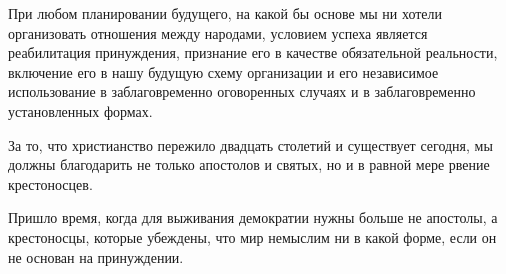 При любом планировании будущего, на какой бы основе мы ни хотели организовать отношения между народами, условием успеха является реабилитация принуждения, признание его в качестве обязательной реальности, включение его в нашу будущую схему организации и его независимое использование в заблаговременно оговоренных случаях и в заблаговременно установленных формах.

За то, что христианство пережило двадцать столетий и существует сегодня, мы должны благодарить не только апостолов и святых, но и в равной мере рвение крестоносцев.

Пришло время, когда для выживания демократии нужны больше не апостолы, а крестоносцы, которые убеждены, что мир немыслим ни в какой форме, если он не основан на принуждении.
